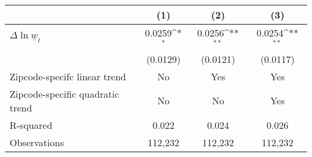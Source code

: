 {
\def\sym#1{\ifmmode^{#1}\else\(^{#1}\)\fi}
\begin{tabular}{l*{3}{c}}
\hline\hline
          &\multicolumn{1}{c}{(1)}         &\multicolumn{1}{c}{(2)}         &\multicolumn{1}{c}{(3)}         \\
\hline
$\Delta \ln \underline{w}_t$&   0.0259\sym{*}  &   0.0256\sym{**} &   0.0254\sym{**} \\
          & (0.0129)         & (0.0121)         & (0.0117)         \\
\hline
Zipcode-specifc linear trend&       No         &      Yes         &      Yes         \\
Zipcode-specific quadratic trend&       No         &       No         &      Yes         \\
R-squared &    0.022         &    0.024         &    0.026         \\
Observations&  112,232         &  112,232         &  112,232         \\
\hline\hline
\end{tabular}
}
